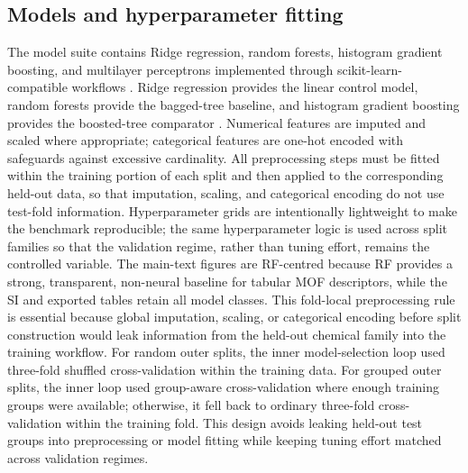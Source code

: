 \documentclass[11pt,a4paper]{article}
\begin{document}
\subsection*{Models and hyperparameter fitting}
The model suite contains Ridge regression, random forests, histogram gradient boosting, and multilayer perceptrons implemented through scikit-learn-compatible workflows \citep{Pedregosa2011ScikitLearn}. Ridge regression provides the linear control model, random forests provide the bagged-tree baseline, and histogram gradient boosting provides the boosted-tree comparator \citep{Hoerl1970Ridge,Breiman2001RandomForests,Friedman2001GreedyFunction}. Numerical features are imputed and scaled where appropriate; categorical features are one-hot encoded with safeguards against excessive cardinality. All preprocessing steps must be fitted within the training portion of each split and then applied to the corresponding held-out data, so that imputation, scaling, and categorical encoding do not use test-fold information. Hyperparameter grids are intentionally lightweight to make the benchmark reproducible; the same hyperparameter logic is used across split families so that the validation regime, rather than tuning effort, remains the controlled variable. The main-text figures are RF-centred because RF provides a strong, transparent, non-neural baseline for tabular MOF descriptors, while the SI and exported tables retain all model classes. This fold-local preprocessing rule is essential because global imputation, scaling, or categorical encoding before split construction would leak information from the held-out chemical family into the training workflow. For random outer splits, the inner model-selection loop used three-fold shuffled cross-validation within the training data. For grouped outer splits, the inner loop used group-aware cross-validation where enough training groups were available; otherwise, it fell back to ordinary three-fold cross-validation within the training fold. This design avoids leaking held-out test groups into preprocessing or model fitting while keeping tuning effort matched across validation regimes.
\end{document}

